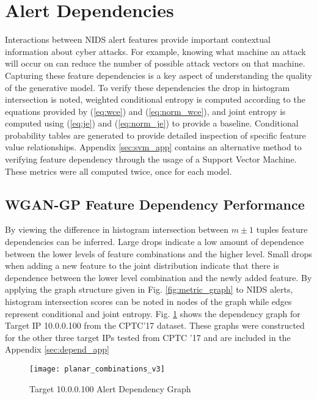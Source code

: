 \section{Alert Dependencies}
\label{sec:depend}

Interactions between NIDS alert features provide important contextual information about cyber attacks. For example, knowing what machine an attack will occur on can reduce the number of possible attack vectors on that machine. Capturing these feature dependencies is a key aspect of understanding the quality of the generative model. To verify these dependencies the drop in histogram intersection is noted, weighted conditional entropy is computed according to the equations provided by (\ref{eq:wce}) and (\ref{eq:norm_wce}), and joint entropy is computed using (\ref{eq:je}) and (\ref{eq:norm_je}) to provide a baseline. Conditional probability tables are generated to provide detailed inspection of specific feature value relationships. Appendix \ref{sec:svm_app} contains an alternative method to verifying feature dependency through the usage of a Support Vector Machine. These metrics were all computed twice, once for each model.

\subsection{WGAN-GP Feature Dependency Performance}

By viewing the difference in histogram intersection between $m\pm1$ tuples feature dependencies can be inferred. Large drops indicate a low amount of dependence between the lower levels of feature combinations and the higher level. Small drops when adding a new feature to the joint distribution indicate that there is dependence between the lower level combination and the newly added feature. By applying the graph structure given in Fig. \ref{fig:metric_graph} to NIDS alerts, histogram intersection scores can be noted in nodes of the graph while edges represent conditional and joint entropy. Fig. \ref{fig:alert_depend_1} shows the dependency graph for Target IP 10.0.0.100 from the CPTC'17 dataset. These graphs were constructed for the other three target IPs tested from CPTC '17 and are included in the Appendix \ref{sec:depend_app}

\begin{figure}[!htbp]
	\centering
	\texttt{[image: planar\_combinations\_v3]}
	\caption{
		Target 10.0.0.100 Alert Dependency Graph
	}
	\label{fig:alert_depend_1}
\end{figure}

